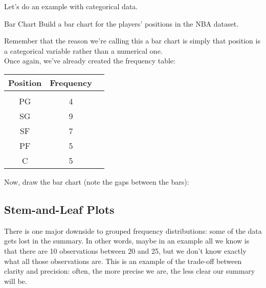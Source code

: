 Let's do an example with categorical data.

\begin{example}{Bar Chart}
Build a bar chart for the players' positions in the NBA dataset.

\sol
Remember that the reason we're calling this a bar chart is simply that position is a categorical variable rather than a numerical one.\\

Once again, we've already created the frequency table:
\begin{center}
\begin{tabular}{c c c}
\textbf{Position} & \textbf{Frequency}\\
\hline
& & \\
PG & 4\\
SG & 9\\
SF & 7\\
PF & 5\\
C & 5
\end{tabular}
\end{center}

Now, draw the bar chart (note the gaps between the bars):
\begin{center}
\end{center}
\end{example}

\subsection{Stem-and-Leaf Plots}
There is one major downside to grouped frequency distributions: some of the data gets lost in the summary.  In other words, maybe in an example all we know is that there are 10 observations between 20 and 25, but we don't know exactly what all those observations are.  This is an example of the trade-off between clarity and precision: often, the more precise we are, the less clear our summary will be.

